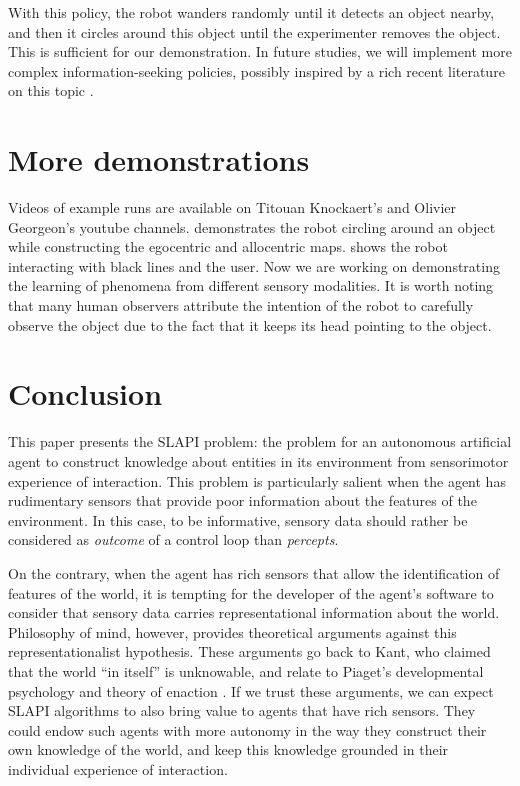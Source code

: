 \documentclass[pmlr]{jmlr}%
\begin{document}
With this policy, the robot wanders randomly until it detects an object nearby, and then it circles around this object until the experimenter removes the object. 
This is sufficient for our demonstration. 
In future studies, we will implement more complex information-seeking policies, possibly inspired by a rich recent literature on this topic \citep[e.g.][]{gottlieb_towards_2018}. 


\section{More demonstrations}

Videos of example runs are available on Titouan Knockaert's and Olivier Georgeon's youtube channels.
\cite{knockaert_demonstration_2022} demonstrates the robot circling around an object while constructing the egocentric and allocentric maps. 
\cite{georgeon_demontration_2021} shows the robot interacting with black lines and the user.
Now we are working on demonstrating the learning of phenomena from different sensory modalities. 
It is worth noting that many human observers attribute the intention of the robot to carefully observe the object due to the fact that it keeps its head pointing to the object. 


\section{Conclusion}

This paper presents the SLAPI problem: the problem for an autonomous artificial agent to construct knowledge about entities in its environment from sensorimotor experience of interaction.  
This problem is particularly salient when the agent has rudimentary sensors that provide poor information about the features of the environment. 
In this case, to be informative, sensory data should rather be considered as \textit{outcome} of a control loop than \textit{percepts}.

On the contrary, when the agent has rich sensors that allow the identification of features of the world, it is tempting for the developer of the agent's software to consider that sensory data carries representational information about the world. 
Philosophy of mind, however, provides theoretical arguments against this representationalist hypothesis. 
These arguments go back to Kant, who claimed that the world ``in itself'' is unknowable, and relate to Piaget's developmental psychology and theory of enaction \citep[e.g.,][]{froese_enactive_2009}. 
If we trust these arguments, we can expect SLAPI algorithms to also bring value to agents that have rich sensors. 
They could endow such agents with more autonomy in the way they construct their own knowledge of the world, and keep this knowledge grounded in their individual experience of interaction.
\end{document}
